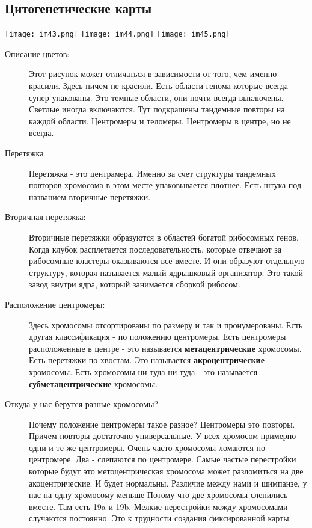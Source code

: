 \subsection{Цитогенетические карты} 
\texttt{[image: im43.png]}
\texttt{[image: im44.png]}
\texttt{[image: im45.png]}

\begin{description}
\item[Описание цветов:]
Этот рисунок может отличаться в зависимости от того, 
чем именно красили. Здесь ничем не красили. Есть области 
генома которые всегда супер упакованы. Это темные 
области, они почти всегда выключены. Светлые иногда включаются. 
Тут подкрашены тандемные повторы на каждой области. Центромеры и 
теломеры. Центромеры в центре, но не 
всегда. 

\item[Перетяжка]
Перетяжка - это центрамера. Именно за счет структуры тандемных повторов хромосома в этом 
месте упаковывается плотнее. Есть штука под названием вторичные перетяжки. 

\item[Вторичная перетяжка:]
Вторичные перетяжки образуются в областей богатой рибосомных генов. Когда 
клубок расплетается последовательность, 
которые отвечают за рибосомные кластеры оказываются все вместе. 
И они образуют отдельную структуру, которая называется малый ядрышковый организатор. Это 
такой завод внутри ядра, который занимается сборкой рибосом. 

\item[Расположение центромеры:]
Здесь хромосомы отсортированы по размеру 
и так и пронумерованы. Есть другая классификация - 
по положению центромеры. Есть центромеры расположенные в центре - 
это называется \textbf{метацентрические} хромосомы. Есть 
перетяжки по хвостам. Это называется \textbf{акроцентрические} хромосомы. 
Есть хромосомы ни туда ни туда - это называется \textbf{субметацентрические}
хромосомы. 

\item[Откуда у нас берутся разные хромосомы?]
 Почему положение центромеры такое  разное? 
Центромеры это повторы. Причем повторы достаточно универсальные. У всех 
хромосом примерно одни и те же центромеры. Очень часто хромосомы ломаются 
по центромере. Два - слепаются по центромере. Самые частые перестройки которые будут это
метоцентрическая хромосома может разломиться на две акоцентрические. 
И будет нормальны. 
Различие между нами и шимпанзе, у нас на одну хромосому меньше
Потому что две хромосомы слепились вместе. Там есть 19a и 19b. Мелкие 
перестройки между хромосомами случаются постоянно. Это к трудности 
создания фиксированной карты.  

\end{description}
